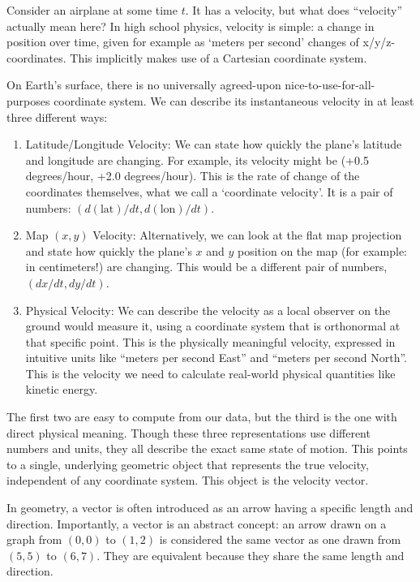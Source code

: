 \documentclass[twocolumn]{article}
\begin{document}
Consider an airplane at some time \(t\). It has a velocity, but what
does ``velocity'' actually mean here? In high school physics, velocity
is simple: a change in position over time, given for example as
`meters per second' changes of x/y/z-coordinates. This implicitly
makes use of a Cartesian coordinate system.

On Earth's surface, there is no universally agreed-upon
nice-to-use-for-all-purposes coordinate system. We can describe its
instantaneous velocity in at least three different ways:

\begin{enumerate}
\def\labelenumi{\arabic{enumi}.}
\item
  Latitude/Longitude Velocity: We can state how quickly the plane's
  latitude and longitude are changing. For example, its velocity might
  be (+0.5 degrees/hour, +2.0 degrees/hour). This is the rate of change
  of the coordinates themselves, what we call a `coordinate velocity'. It
  is a pair of numbers: \((d(\text{lat})/dt, d(\text{lon})/dt)\).
\item
  Map \((x,y)\) Velocity: Alternatively, we can look at the flat map
  projection and state how quickly the plane's \(x\) and \(y\)
  position on the map (for example: in centimeters!) are
  changing. This would be a different pair of numbers, \((dx/dt,
  dy/dt)\).
\item
  Physical Velocity: We can describe the velocity as a local observer on
  the ground would measure it, using a coordinate system that is
  orthonormal at that specific point. This is the physically meaningful
  velocity, expressed in intuitive units like ``meters per second East''
  and ``meters per second North''. This is the velocity we need to
  calculate real-world physical quantities like kinetic energy.
\end{enumerate}

The first two are easy to compute from our data, but the third is the
one with direct physical meaning. Though these three representations use
different numbers and units, they all describe the exact same state of
motion. This points to a single, underlying geometric object that
represents the true velocity, independent of any coordinate system. This
object is the velocity vector.

In geometry, a vector is often introduced as an arrow having a specific
length and direction. Importantly, a vector is an abstract concept: an
arrow drawn on a graph from \((0,0)\) to \((1,2)\) is considered the
same vector as one drawn from \((5,5)\) to \((6,7)\). They are
equivalent because they share the same length and direction.
\end{document}
